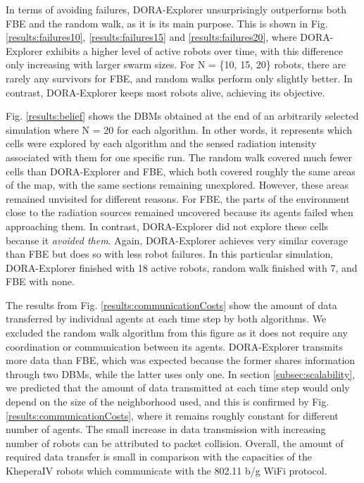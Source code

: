 \documentclass[letterpaper, 10 pt, conference]{ieeeconf}
\begin{document}
In terms of avoiding failures, DORA-Explorer unsurprisingly outperforms both
FBE and the random walk, as it is its main purpose. This is shown in
Fig. \ref{results:failures10}, \ref{results:failures15} and
\ref{results:failures20}, where DORA-Explorer exhibits a higher level of active
robots over time, with this difference only increasing with larger
swarm sizes. For N = \{10, 15, 20\} robots, there are rarely any
survivors for FBE, and random walks perform only slightly better. In
contrast, DORA-Explorer keeps most robots alive, achieving its objective.

Fig. \ref{results:belief} shows the DBMs obtained at the end of an
arbitrarily selected simulation where N = 20 for each algorithm.  In
other words, it represents which cells were explored by each algorithm
and the sensed radiation intensity associated with them for one specific run. The random
walk covered much fewer cells than DORA-Explorer and FBE, which both covered
roughly the same areas of the map, with the same sections remaining
unexplored. However, these areas remained unvisited for different
reasons. For FBE, the parts of the environment close to the radiation
sources remained uncovered because its agents failed when approaching
them. In contrast, DORA-Explorer did not explore these cells because it
\textit{avoided them}. Again, DORA-Explorer achieves very similar coverage than
FBE but does so with less robot failures. In this particular
simulation, DORA-Explorer finished with 18 active robots, random walk finished
with 7, and FBE with none.


The results from Fig. \ref{results:communicationCosts} show the amount
of data transferred by individual agents at each time step by both
algorithms. We excluded the random walk algorithm from this figure as
it does not require any coordination or communication between its
agents. DORA-Explorer transmits more data than FBE, which was expected because
the former shares information through two DBMs, while the latter uses
only one. In section \ref{subsec:scalability}, we predicted that the
amount of data transmitted at each time step would only depend on the
size of the neighborhood used, and this is confirmed by
Fig. \ref{results:communicationCosts}, where it remains roughly
constant for different number of agents. The small increase in data
transmission with increasing number of robots can be attributed to
packet collision. Overall, the amount of required data transfer is
small in comparison with the capacities of the KheperaIV robots which
communicate with the 802.11 b/g WiFi protocol.
\end{document}
